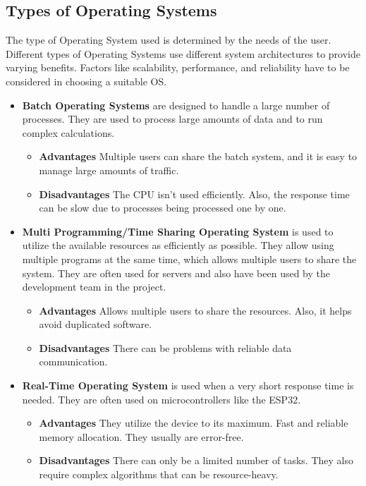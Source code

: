 \cite{WhatIsAnOs}

\subsection {Types of Operating Systems}

The type of Operating System used is determined by the needs of the user. 
Different types of Operating Systems use different system architectures to provide varying benefits.
Factors like scalability, performance, and reliability have to be considered in choosing a suitable OS.

\begin{itemize}

    \item \textbf{Batch Operating Systems} are designed to handle a large number of processes. They are used to process large amounts of data and to run complex calculations.
    \begin{itemize}
        \item \textbf{Advantages} Multiple users can share the batch system, and it is easy to manage large amounts of traffic.
        \item \textbf{Disadvantages} The CPU isn't used efficiently. Also, the response time can be slow due to processes being processed one by one.
    \end{itemize} 

    \item \textbf{Multi Programming/Time Sharing Operating System} is used to utilize the available resources as efficiently as possible. They allow using multiple programs at the same time, which allows multiple users to share the system.
    They are often used for servers and also have been used by the development team in the project.

    \begin{itemize}
        \item \textbf{Advantages} Allows multiple users to share the resources. Also, it helps avoid duplicated software.
        \item \textbf{Disadvantages} There can be problems with reliable data communication. 
    \end{itemize} 

    \item \textbf{Real-Time Operating System} is used when a very short response time is needed. They are often used on microcontrollers like the ESP32.
    \begin{itemize}
        \item \textbf{Advantages} They utilize the device to its maximum. Fast and reliable memory allocation. They usually are error-free.
        \item \textbf{Disadvantages} There can only be a limited number of tasks. They also require complex algorithms that can be resource-heavy.
    \end{itemize} 

\end{itemize}   

